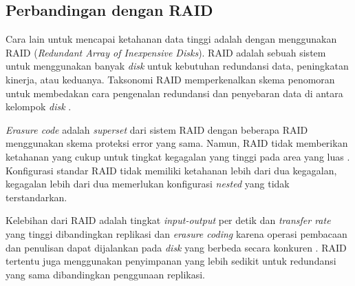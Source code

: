 \subsection{Perbandingan dengan RAID}
\label{sec:perbedaan-dengan-raid}

Cara lain untuk mencapai ketahanan data tinggi adalah dengan menggunakan RAID (\textit{Redundant Array of Inexpensive Disks}). RAID adalah sebuah sistem untuk menggunakan banyak \textit{disk} untuk kebutuhan redundansi data, peningkatan kinerja, atau keduanya. Taksonomi RAID memperkenalkan skema penomoran untuk membedakan cara pengenalan redundansi dan penyebaran data di antara kelompok \textit{disk} \parencite{katz2010raid}.


\textit{Erasure code} adalah \textit{superset} dari sistem RAID dengan beberapa RAID menggunakan skema proteksi error yang sama. Namun, RAID tidak memberikan ketahanan yang cukup untuk tingkat kegagalan yang tinggi pada area yang luas \parencite{weatherspoon2002erasure}. Konfigurasi standar RAID tidak memiliki ketahanan lebih dari dua kegagalan, kegagalan lebih dari dua memerlukan konfigurasi \textit{nested} yang tidak terstandarkan.

Kelebihan dari RAID adalah tingkat \textit{input-output} per detik dan \textit{transfer rate} yang tinggi dibandingkan replikasi dan \textit{erasure coding} karena operasi pembacaan dan penulisan dapat dijalankan pada \textit{disk} yang berbeda secara konkuren \parencite{katz2010raid}. RAID tertentu juga menggunakan penyimpanan yang lebih sedikit untuk redundansi yang sama dibandingkan penggunaan replikasi. 

